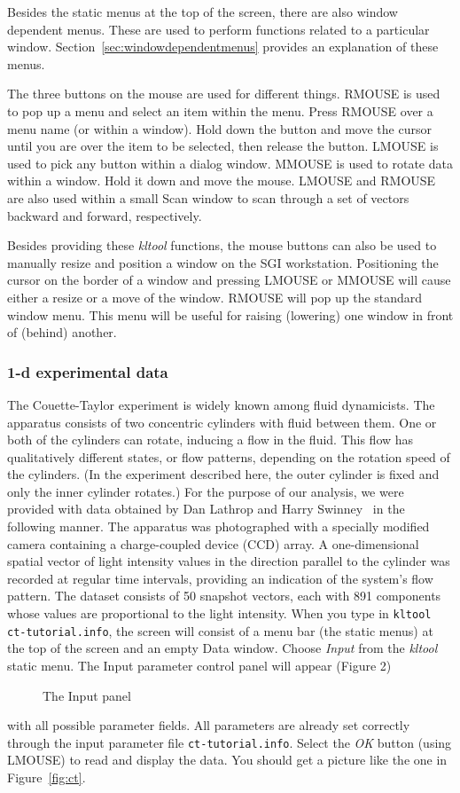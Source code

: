 Besides the static menus at the top of the screen, there are also
window dependent menus.  These are used to perform functions related to
a particular window.  Section~\ref{sec:windowdependentmenus}
provides an explanation of these menus.

The three buttons on the mouse are used for different things.
RMOUSE is used to pop up a menu and select an item within the menu.  
Press RMOUSE over a menu name (or within a window).  Hold down the
button and move
the cursor until you are over the item to be selected, then release the
button.
LMOUSE is used to pick any button within a dialog window.
MMOUSE is used to rotate data within a window.  Hold it down and move the
mouse.
LMOUSE and RMOUSE are also used within a small Scan window to scan through
a set of vectors backward and forward, respectively.

Besides providing these {\sl kltool} functions, the mouse buttons can also
be used to manually resize and position a window on the SGI workstation.
Positioning the cursor on the border of a window and pressing LMOUSE or
MMOUSE will cause either a resize or a move of the window.  RMOUSE will
pop up the standard window menu.  This menu will be useful for raising 
(lowering) one window in front of (behind) another.

\subsubsection{1-d experimental data}
The Couette-Taylor experiment is widely known among fluid dynamicists.  The
apparatus consists of two concentric cylinders with fluid between them.
One or both of the cylinders can rotate, inducing a flow in the fluid.
This flow has qualitatively different states, or flow patterns,
depending on the 
rotation speed of the cylinders.  (In the experiment described here,
the outer cylinder is fixed and only the inner cylinder rotates.)
For the purpose of our analysis, 
we were provided with data obtained by Dan Lathrop and
Harry Swinney~\cite{Swinney} in the following manner.  
The apparatus was photographed with a specially modified camera containing
a charge-coupled device (CCD) array.
A one-dimensional spatial vector of light intensity values in the 
direction parallel to the cylinder was recorded at regular
time intervals, providing an indication of the system's flow pattern.
The dataset consists of 50 snapshot vectors, each with 891 
components whose values are proportional to the light intensity.
When you type in {\tt kltool ct-tutorial.info},
the screen will consist of a menu bar (the static menus) at the
top of the screen and an empty Data window. Choose {\sl Input} from the 
{\sl kltool} static menu.  The Input parameter control panel will 
appear (Figure 2)
\begin{figure}
\caption{The Input panel}
\label{input}
\end{figure}
with all possible parameter fields.
All parameters are already set correctly through
the input parameter file {\tt ct-tutorial.info}. 
Select the {\sl OK} button (using LMOUSE) to read and display the data.
You should get a picture like the one in Figure~\ref{fig:ct}.

